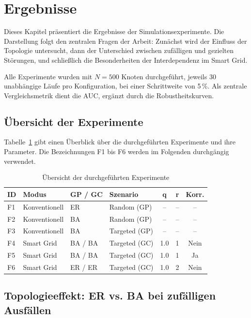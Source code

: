 \section{Ergebnisse}
\label{sec:ergebnisse}

Dieses Kapitel präsentiert die Ergebnisse der Simulationsexperimente. Die Darstellung folgt den zentralen Fragen der Arbeit: Zunächst wird der Einfluss der Topologie untersucht, dann der Unterschied zwischen zufälligen und gezielten Störungen, und schließlich die Besonderheiten der Interdependenz im Smart Grid.

Alle Experimente wurden mit $N = 500$ Knoten durchgeführt, jeweils 30 unabhängige Läufe pro Konfiguration, bei einer Schrittweite von 5\,\%. Als zentrale Vergleichsmetrik dient die AUC, ergänzt durch die Robustheitskurven.

\subsection{Übersicht der Experimente}

Tabelle~\ref{tab:experimente} gibt einen Überblick über die durchgeführten Experimente und ihre Parameter. Die Bezeichnungen F1 bis F6 werden im Folgenden durchgängig verwendet.

\begin{table}[H]
\centering
\caption{Übersicht der durchgeführten Experimente}
\label{tab:experimente}
\begin{tabular}{llllccc}
\hline
\textbf{ID} & \textbf{Modus} & \textbf{GP / GC} & \textbf{Szenario} & \textbf{q} & \textbf{r} & \textbf{Korr.} \\
\hline
F1 & Konventionell & ER & Random (GP) & -- & -- & -- \\
F2 & Konventionell & BA & Random (GP) & -- & -- & -- \\
F3 & Konventionell & BA & Targeted (GP) & -- & -- & -- \\
F4 & Smart Grid & BA / BA & Targeted (GC) & 1.0 & 1 & Nein \\
F5 & Smart Grid & BA / BA & Targeted (GC) & 1.0 & 1 & Ja \\
F6 & Smart Grid & ER / ER & Targeted (GC) & 1.0 & 2 & Nein \\
\hline
\end{tabular}
\end{table}

\subsection{Topologieeffekt: ER vs. BA bei zufälligen Ausfällen}

